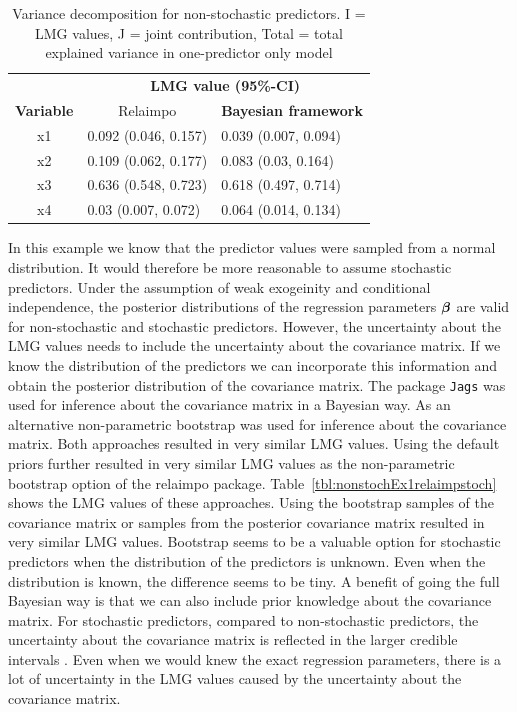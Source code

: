 \documentclass[11pt,a4paper,twoside]{book}
\begin{document}
\begin{table}[h]
\caption{Variance decomposition for non-stochastic predictors. I = LMG values, J = joint contribution, Total = total explained variance in one-predictor only model}
\centering
\begin{tabular}{cll}
   \toprule
   &\multicolumn{2}{c}{\textbf{LMG value (95\%-CI)}} \\
 \textbf{Variable} & \multicolumn{1}{c}{Relaimpo} & \textbf{Bayesian framework}  \\
  \hline
x1 & 0.092 (0.046, 0.157)  & 0.039 (0.007, 0.094)  \\ 
x2 & 0.109 (0.062, 0.177)  & 0.083 (0.03, 0.164)   \\ 
x3 & 0.636 (0.548, 0.723)  & 0.618 (0.497, 0.714)  \\ 
x4 & 0.03 (0.007, 0.072) & 0.064 (0.014, 0.134)  \\ 
   \bottomrule
\end{tabular}
\label{tbl:nonstochEx1relamip}
\end{table}

\FloatBarrier


In this example we know that the predictor values were sampled from a normal distribution. It would therefore be more reasonable to assume stochastic predictors. Under the assumption of weak exogeinity and conditional independence, the posterior distributions of the regression parameters ${\boldsymbol{\beta}}$ are valid for non-stochastic and stochastic predictors. However, the uncertainty about the LMG values needs to include the uncertainty about the covariance matrix. If we know the distribution of the predictors we can incorporate this information and obtain the posterior distribution of the covariance matrix. The package \texttt{Jags} was used for inference about the covariance matrix in a Bayesian way. As an alternative non-parametric bootstrap was used for inference about the covariance matrix. Both approaches resulted in very similar LMG values. Using the default priors further resulted in very similar LMG values as the non-parametric bootstrap option of the relaimpo package. Table~\ref{tbl:nonstochEx1relaimpstoch} shows the LMG values of these approaches. Using the bootstrap samples of the covariance matrix or samples from the posterior covariance matrix resulted in very similar LMG values. Bootstrap seems to be a valuable option for stochastic predictors when the distribution of the predictors is unknown. Even when the distribution is known, the difference seems to be tiny. A benefit of going the full Bayesian way is that we can also include prior knowledge about the covariance matrix. For stochastic predictors, compared to non-stochastic predictors, the uncertainty about the covariance matrix is reflected in the larger credible intervals . Even when we would knew the exact regression parameters, there is a lot of uncertainty in the LMG values caused by the uncertainty about the covariance matrix. 
\end{document}
